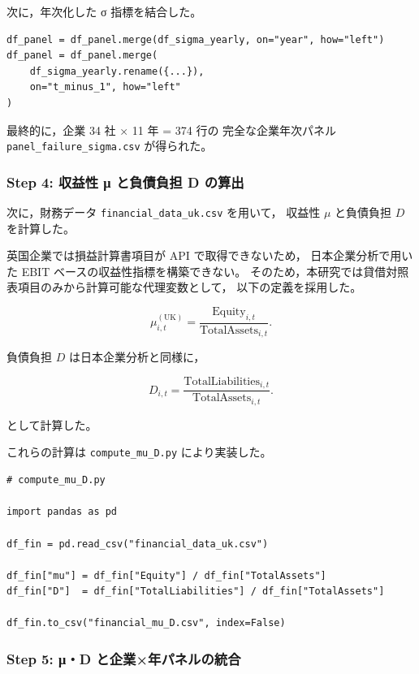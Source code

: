 次に，年次化した σ 指標を結合した。

\begin{verbatim}
df_panel = df_panel.merge(df_sigma_yearly, on="year", how="left")
df_panel = df_panel.merge(
    df_sigma_yearly.rename({...}),
    on="t_minus_1", how="left"
)
\end{verbatim}

最終的に，企業 34 社 × 11 年 = 374 行の
完全な企業年次パネル \texttt{panel\_failure\_sigma.csv} が得られた。


\subsubsection*{Step 4: 収益性 μ と負債負担 D の算出}

次に，財務データ \texttt{financial\_data\_uk.csv} を用いて，
収益性 $\mu$ と負債負担 $D$ を計算した。

英国企業では損益計算書項目が API で取得できないため，
日本企業分析で用いた EBIT ベースの収益性指標を構築できない。
そのため，本研究では貸借対照表項目のみから計算可能な代理変数として，
以下の定義を採用した。



\[
\mu_{i,t}^{(\text{UK})}
= \frac{\text{Equity}_{i,t}}{\text{TotalAssets}_{i,t}}.
\]



負債負担 $D$ は日本企業分析と同様に，



\[
D_{i,t}
= \frac{\text{TotalLiabilities}_{i,t}}{\text{TotalAssets}_{i,t}}.
\]



として計算した。

これらの計算は \texttt{compute\_mu\_D.py} により実装した。

\begin{verbatim}
# compute_mu_D.py

import pandas as pd

df_fin = pd.read_csv("financial_data_uk.csv")

df_fin["mu"] = df_fin["Equity"] / df_fin["TotalAssets"]
df_fin["D"]  = df_fin["TotalLiabilities"] / df_fin["TotalAssets"]

df_fin.to_csv("financial_mu_D.csv", index=False)
\end{verbatim}

\subsubsection*{Step 5: μ・D と企業×年パネルの統合}


